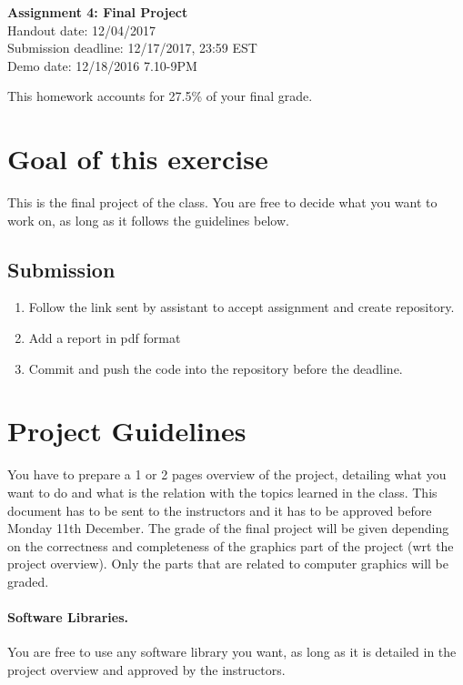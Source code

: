 \documentclass[11pt]{article}
\begin{document}
\hspace{50pt}

\begin{center}

{\Huge \textbf{Assignment 4: Final Project}}\\
\vspace{10pt}
Handout date: 12/04/2017\\
Submission deadline: 12/17/2017,  23:59 EST\\
Demo date: 12/18/2016 7.10-9PM
\end{center}

\noindent This homework accounts for 27.5\% of your final grade. 

\section*{Goal of this exercise}
This is the final project of the class. You are free to decide what you want to work on, as long as it follows the guidelines below.

\subsection*{Submission}

\begin{enumerate}
\item Follow the link sent by assistant to accept assignment and create repository.
\item Add a report in pdf format 
\item Commit and push the code into the repository before the deadline.
\end{enumerate}

\section{Project Guidelines}

You have to prepare a 1 or 2 pages overview of the project, detailing what you want to do and what is the relation with the topics learned in the class. This document has to be sent to the instructors and it has to be approved before Monday 11th December. The grade of the final project will be given depending on the correctness and completeness of the graphics part of the project (wrt the project overview). Only the parts that are related to computer graphics will be graded.

\paragraph{Software Libraries.} You are free to use any software library you want, as long as it is detailed in the project overview and approved by the instructors.
\end{document}
